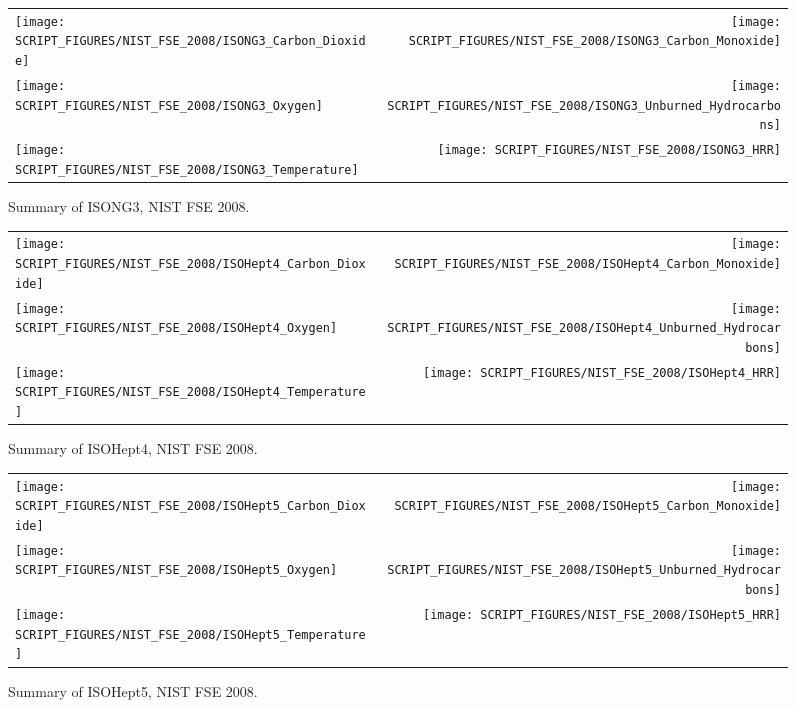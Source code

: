 \begin{figure}[!ht]
\begin{tabular*}{\textwidth}{l@{\extracolsep{\fill}}r}
\texttt{[image: SCRIPT\_FIGURES/NIST\_FSE\_2008/ISONG3\_Carbon\_Dioxide]} &
\texttt{[image: SCRIPT\_FIGURES/NIST\_FSE\_2008/ISONG3\_Carbon\_Monoxide]} \\
\texttt{[image: SCRIPT\_FIGURES/NIST\_FSE\_2008/ISONG3\_Oxygen]} &
\texttt{[image: SCRIPT\_FIGURES/NIST\_FSE\_2008/ISONG3\_Unburned\_Hydrocarbons]} \\
\texttt{[image: SCRIPT\_FIGURES/NIST\_FSE\_2008/ISONG3\_Temperature]} &
\texttt{[image: SCRIPT\_FIGURES/NIST\_FSE\_2008/ISONG3\_HRR]}
\end{tabular*}
\caption[Summary of ISONG3, NIST FSE 2008]{Summary of ISONG3, NIST FSE 2008.}
\label{NIST_FSE_1994_ISONG3}
\end{figure}

\newpage

\begin{figure}[p]
\begin{tabular*}{\textwidth}{l@{\extracolsep{\fill}}r}
\texttt{[image: SCRIPT\_FIGURES/NIST\_FSE\_2008/ISOHept4\_Carbon\_Dioxide]} &
\texttt{[image: SCRIPT\_FIGURES/NIST\_FSE\_2008/ISOHept4\_Carbon\_Monoxide]} \\
\texttt{[image: SCRIPT\_FIGURES/NIST\_FSE\_2008/ISOHept4\_Oxygen]} &
\texttt{[image: SCRIPT\_FIGURES/NIST\_FSE\_2008/ISOHept4\_Unburned\_Hydrocarbons]} \\
\texttt{[image: SCRIPT\_FIGURES/NIST\_FSE\_2008/ISOHept4\_Temperature]} &
\texttt{[image: SCRIPT\_FIGURES/NIST\_FSE\_2008/ISOHept4\_HRR]}
\end{tabular*}
\caption[Summary of ISOHept4, NIST FSE 2008]{Summary of ISOHept4, NIST FSE 2008.}
\label{NIST_FSE_1994_ISOHept4}
\end{figure}

\begin{figure}[p]
\begin{tabular*}{\textwidth}{l@{\extracolsep{\fill}}r}
\texttt{[image: SCRIPT\_FIGURES/NIST\_FSE\_2008/ISOHept5\_Carbon\_Dioxide]} &
\texttt{[image: SCRIPT\_FIGURES/NIST\_FSE\_2008/ISOHept5\_Carbon\_Monoxide]} \\
\texttt{[image: SCRIPT\_FIGURES/NIST\_FSE\_2008/ISOHept5\_Oxygen]} &
\texttt{[image: SCRIPT\_FIGURES/NIST\_FSE\_2008/ISOHept5\_Unburned\_Hydrocarbons]} \\
\texttt{[image: SCRIPT\_FIGURES/NIST\_FSE\_2008/ISOHept5\_Temperature]} &
\texttt{[image: SCRIPT\_FIGURES/NIST\_FSE\_2008/ISOHept5\_HRR]}
\end{tabular*}
\caption[Summary of ISOHept5, NIST FSE 2008]{Summary of ISOHept5, NIST FSE 2008.}
\label{NIST_FSE_1994_ISOHept5}
\end{figure}

